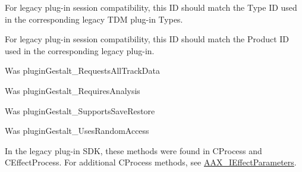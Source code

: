\begin{DoxyRefList}
 For legacy plug-\/in session compatibility, this ID should match the Type ID used in the corresponding legacy TDM plug-\/in Types.  
\item[Member \mbox{\hyperlink{a00674_a13e384f22825afd3db6d68395b79ce0da3a41fcdff5af1a4fd19dcbca7b1ba6f3}{AAX\+\_\+e\+Property\+\_\+\+Product\+ID}} ]\label{a00802__porting_notes000042}%
%
 For legacy plug-\/in session compatibility, this ID should match the Product ID used in the corresponding legacy plug-\/in.  
\item[Member \mbox{\hyperlink{a00674_a13e384f22825afd3db6d68395b79ce0daa59caaf3d7c3e195a32b8cb09a9baac2}{AAX\+\_\+e\+Property\+\_\+\+Requests\+All\+Track\+Data}} ]\label{a00802__porting_notes000052}%
%
 Was plugin\+Gestalt\+\_\+\+Requests\+All\+Track\+Data  
\item[Member \mbox{\hyperlink{a00674_a13e384f22825afd3db6d68395b79ce0da925c49bb79454b33bf1d5f4cb09d373f}{AAX\+\_\+e\+Property\+\_\+\+Requires\+Analysis}} ]\label{a00802__porting_notes000048}%
%
 Was plugin\+Gestalt\+\_\+\+Requires\+Analysis  
\item[Member \mbox{\hyperlink{a00674_a13e384f22825afd3db6d68395b79ce0da6d42a3a901f36b74e7b9b8a84d4d5298}{AAX\+\_\+e\+Property\+\_\+\+Supports\+Save\+Restore}} ]\label{a00802__porting_notes000058}%
%
 Was plugin\+Gestalt\+\_\+\+Supports\+Save\+Restore  
\item[Member \mbox{\hyperlink{a00674_a13e384f22825afd3db6d68395b79ce0dab0bbaabe0a03b37e5a69f04a6f306076}{AAX\+\_\+e\+Property\+\_\+\+Uses\+Random\+Access}} ]\label{a00802__porting_notes000047}%
%
 Was plugin\+Gestalt\+\_\+\+Uses\+Random\+Access  
\item[Class \mbox{\hyperlink{a01949}{AAX\+\_\+\+IACFEffect\+GUI}} ]\label{a00802__porting_notes000030}%
%
 In the legacy plug-\/in SDK, these methods were found in CProcess and CEffect\+Process. For additional CProcess methods, see \mbox{\hyperlink{a02113}{AAX\+\_\+\+IEffect\+Parameters}}. 
\item[Member \mbox{\hyperlink{a01949_a3922a4b9fef09e88440d7655422c2b96}{AAX\+\_\+\+IACFEffect\+GUI\+::Set\+Control\+Highlight\+Info}} (AAX\+\_\+\+CParam\+ID i\+Parameter\+ID, AAX\+\_\+\+CBoolean i\+Is\+Highlighted, AAX\+\_\+\+EHighlight\+Color i\+Color)=0]\label{a00802__porting_notes000031}%
%

\end{DoxyRefList}
